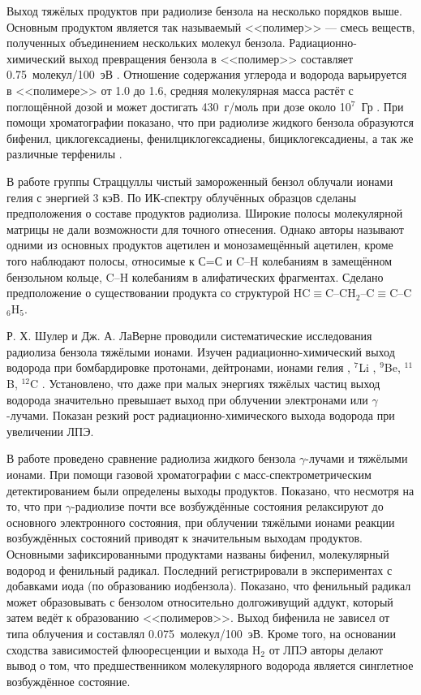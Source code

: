 { Выход тяжёлых продуктов при радиолизе бензола на несколько порядков выше. Основным продуктом является так называемый 
 <<полимер>> --- смесь веществ, полученных объединением нескольких молекул бензола. Радиационно-химический выход превращения бензола в <<полимер>> составляет 0.75~молекул/100~эВ \cite{Patrick1954}. 
 Отношение содержания углерода и водорода варьируется в <<полимере>> от 1.0 до 1.6, 
 средняя молекулярная масса растёт с поглощённой дозой и  может достигать 430~г/моль при дозе около 10$^7$~Гр \cite{Patrick1954}. 
 При помощи хроматографии показано, что при радиолизе жидкого бензола образуются бифенил, циклогексадиены, фенилциклогексадиены, бициклогексадиены, а так же различные терфенилы \cite{Cherniak1964, Zimmerli1969}.
 
В работе группы Страццуллы \cite{Strazzulla1991} чистый замороженный бензол облучали ионами гелия с энергией 3 кэВ.
По ИК-спектру облучённых образцов сделаны предположения о составе продуктов радиолиза. Широкие полосы молекулярной матрицы не дали возможности для точного отнесения.
Однако авторы называют одними из основных продуктов ацетилен и монозамещённый ацетилен, кроме того наблюдают полосы, относимые к С=С и C--H колебаниям в замещённом бензольном кольце, C--H колебаниям в алифатических фрагментах.
Сделано предположение о существовании продукта со структурой HC$\equiv$C\nobreakdash--CH$_2$\nobreakdash--C$\equiv$C\nobreakdash--C$_6$H$_5$.

 Р. Х. Шулер и Дж. А. ЛаВерне проводили систематические исследования радиолиза бензола тяжёлыми ионами. 
Изучен радиационно-химический выход водорода при бомбардировке протонами, дейтронами, ионами гелия \cite{Schuler1965},  $^7$Li \cite{LaVerne1982}, $^9$Be, $^{11}$B, $^{12}$C \cite{LaVerne1984}.
Установлено, что даже при малых энергиях тяжёлых частиц выход водорода значительно превышает выход при облучении электронами или $\gamma$-лучами.
Показан резкий рост радиационно-химического выхода водорода при увеличении ЛПЭ.

В работе \cite{LaVerne2002} проведено сравнение радиолиза жидкого бензола $\gamma$\nobreakdash-лучами и тяжёлыми ионами. При помощи газовой хроматографии с масс-спектрометрическим детектированием были определены выходы продуктов. Показано, что несмотря на то, что
 при $\gamma$\nobreakdash-радиолизе почти все возбуждённые состояния релаксируют до основного электронного состояния, при облучении тяжёлыми ионами реакции возбуждённых состояний приводят к значительным выходам продуктов.
 Основными зафиксированными продуктами названы бифенил, молекулярный водород и фенильный радикал. Последний регистрировали в экспериментах с добавками иода (по образованию иодбензола). 
  Показано, что фенильный радикал может образовывать с бензолом относительно долгоживущий аддукт, который затем ведёт к образованию <<полимеров>>.
 Выход бифенила не зависел от типа облучения и составлял 0.075~молекул/100~эВ. Кроме того, на основании сходства зависимостей флюоресценции и выхода H$_2$ от ЛПЭ авторы делают вывод о том, что предшественником молекулярного водорода является
 синглетное возбуждённое состояние.

}

